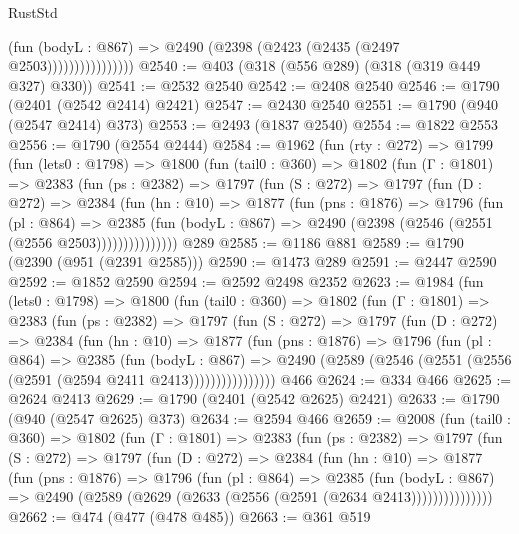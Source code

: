 \begin{lexlean}{RustStd}
\begin{coremodule}
                          (fun (bodyL : @867) =>
                          @2490 (@2398 (@2423 (@2435 (@2497 @2503))))))))))))))))
@2540 := @403 (@318 (@556 @289) (@318 (@319 @449 @327) @330))
@2541 := @2532 @2540
@2542 := @2408 @2540
@2546 := @1790 (@2401 (@2542 @2414) @2421)
@2547 := @2430 @2540
@2551 := @1790 (@940 (@2547 @2414) @373)
@2553 := @2493 (@1837 @2540)
@2554 := @1822 @2553
@2556 := @1790 (@2554 @2444)
@2584 := @1962
    (fun (rty : @272) =>
    @1799
      (fun (lets0 : @1798) =>
      @1800
        (fun (tail0 : @360) =>
        @1802
          (fun (Γ : @1801) =>
          @2383
            (fun (ps : @2382) =>
            @1797
              (fun (S : @272) =>
              @1797
                (fun (D : @272) =>
                @2384
                  (fun (hn : @10) =>
                  @1877
                    (fun (pns : @1876) =>
                    @1796
                      (fun (pl : @864) =>
                      @2385
                        (fun (bodyL : @867) =>
                        @2490 (@2398 (@2546 (@2551 (@2556 @2503)))))))))))))))
    @289
@2585 := @1186 @881
@2589 := @1790 (@2390 (@951 (@2391 @2585)))
@2590 := @1473 @289
@2591 := @2447 @2590
@2592 := @1852 @2590
@2594 := @2592 @2498 @2352
@2623 := @1984
    (fun (lets0 : @1798) =>
    @1800
      (fun (tail0 : @360) =>
      @1802
        (fun (Γ : @1801) =>
        @2383
          (fun (ps : @2382) =>
          @1797
            (fun (S : @272) =>
            @1797
              (fun (D : @272) =>
              @2384
                (fun (hn : @10) =>
                @1877
                  (fun (pns : @1876) =>
                  @1796
                    (fun (pl : @864) =>
                    @2385
                      (fun (bodyL : @867) =>
                      @2490 (@2589 (@2546 (@2551 (@2556 (@2591 (@2594 @2411 @2413))))))))))))))))
    @466
@2624 := @334 @466
@2625 := @2624 @2413
@2629 := @1790 (@2401 (@2542 @2625) @2421)
@2633 := @1790 (@940 (@2547 @2625) @373)
@2634 := @2594 @466
@2659 := @2008
    (fun (tail0 : @360) =>
    @1802
      (fun (Γ : @1801) =>
      @2383
        (fun (ps : @2382) =>
        @1797
          (fun (S : @272) =>
          @1797
            (fun (D : @272) =>
            @2384
              (fun (hn : @10) =>
              @1877
                (fun (pns : @1876) =>
                @1796
                  (fun (pl : @864) =>
                  @2385
                    (fun (bodyL : @867) =>
                    @2490 (@2589 (@2629 (@2633 (@2556 (@2591 (@2634 @2413)))))))))))))))
@2662 := @474 (@477 (@478 @485))
@2663 := @361 @519

\end{coremodule}
\end{lexlean}

